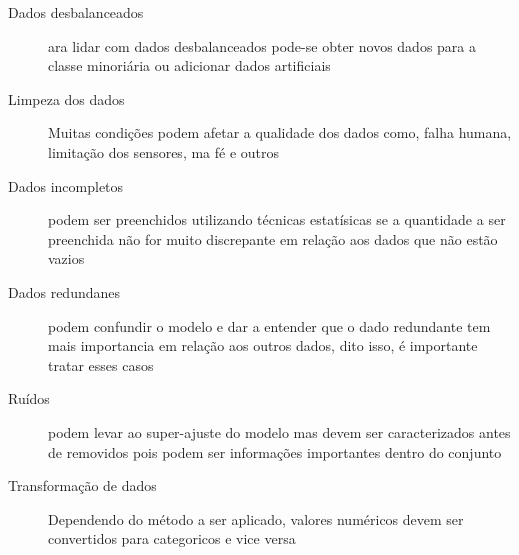 \documentclass[a4paper, 12pt]{article}
\begin{document}
\begin{description}

\item[Dados desbalanceados] ara lidar com dados desbalanceados pode-se obter novos dados para a classe minoriária ou adicionar dados artificiais

\item[Limpeza dos dados] Muitas condições podem afetar a qualidade dos dados como, falha humana, limitação dos sensores, ma fé e outros

\item[Dados incompletos] podem ser preenchidos utilizando técnicas estatísicas se a quantidade a ser preenchida não for muito discrepante em relação aos dados que não estão vazios

\item[Dados redundanes] podem confundir o modelo e dar a entender que o dado redundante tem mais importancia em relação aos outros dados, dito isso, é importante tratar esses casos

\item[Ruídos] podem levar ao super-ajuste do modelo mas devem ser caracterizados antes de removidos pois podem ser informações importantes dentro do conjunto

\item[Transformação de dados] Dependendo do método a ser aplicado, valores numéricos devem ser convertidos para categoricos e vice versa

\end{description}
\end{document}
